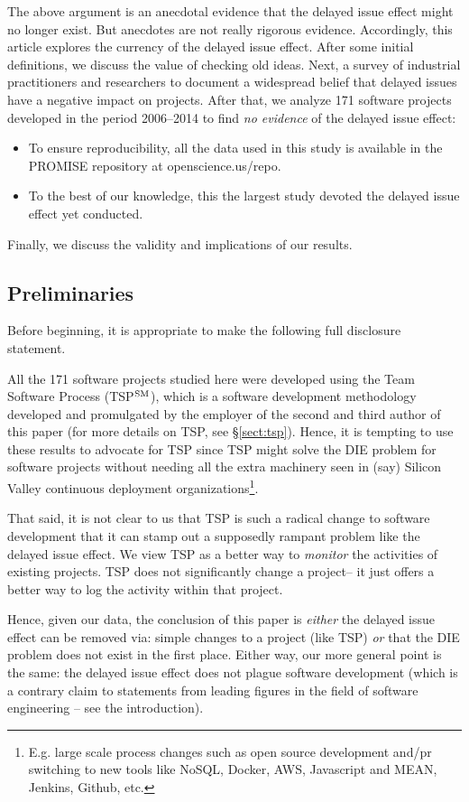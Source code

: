 \documentclass[smallcondesed]{svjour3}
\newcommand{\bi}{\begin{itemize}}%
\newcommand{\ei}{\end{itemize}}
\newcommand{\tion}[1]{\S\ref{sect:#1}}
\begin{document}
The above argument is an anecdotal evidence that  the delayed issue effect might no longer exist. But anecdotes are not really rigorous
evidence. Accordingly,  this article explores the currency of the delayed issue effect.
After some initial definitions, we discuss the
value of checking old ideas. Next, a survey of industrial practitioners and researchers to document a widespread belief that delayed issues have a negative impact on projects.  After that, we  analyze 171 software  projects developed in the period 2006--2014 to find  {\em no evidence} of the delayed issue effect:
\bi
\item
To ensure reproducibility,
all the data  used in this study is available in the PROMISE
repository at openscience.us/repo. 
\item
To the best of our knowledge,
this the largest study devoted the delayed issue effect yet conducted.
\ei
Finally, we discuss the validity and implications of our results.


\subsection{Preliminaries} 
Before beginning, it is appropriate to make the following full disclosure statement. 


All the 171 software projects
studied here were developed using the Team Software Process (TSP$\textsuperscript{SM}$), which is a software development methodology
developed and promulgated by the employer of the second and third author of this paper (for more details on TSP,
 see \tion{tsp}).
Hence, it is tempting to use these results to advocate for TSP since    TSP   might solve  the  DIE problem for  software projects 
without needing all the extra machinery seen in (say)  Silicon Valley 
continuous deployment organizations\footnote{ E.g. large scale process changes such as  open source
development and/pr switching to new tools like NoSQL, Docker, AWS, Javascript and MEAN,  Jenkins, Github, etc.}.


That said, it is not clear to us that TSP is such a radical change to software development that it can
stamp out a supposedly rampant problem like the delayed issue effect. We view TSP as a better way to
 {\em monitor} the activities   of  existing projects.  TSP
 does not significantly change a project-- it just offers a better way to log the activity within
 that project. 
 
Hence, given our data, the conclusion of this paper is {\em  either} the delayed issue effect can be  removed via:
simple changes to a project (like TSP) {\em or} that the DIE problem does not exist in the first place.
Either way, our more general point is the same: the delayed issue effect does not plague software development
(which is a contrary claim to statements from leading figures in the  field of software engineering -- see the introduction).
\end{document}
